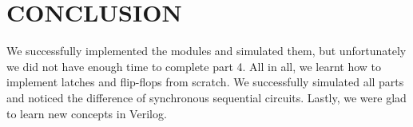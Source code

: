 \documentclass[pdftex,12pt,a4paper]{article}
\begin{document}
\section{CONCLUSION}
We successfully implemented the modules and simulated them, but unfortunately we did not have enough time to complete part 4. All in all, we learnt how to implement latches and flip-flops from scratch. We successfully simulated all parts and noticed the difference of synchronous sequential circuits. Lastly, we were glad to learn new concepts in Verilog.




\nocite{ref1}
\nocite{overleaf}
\end{document}
